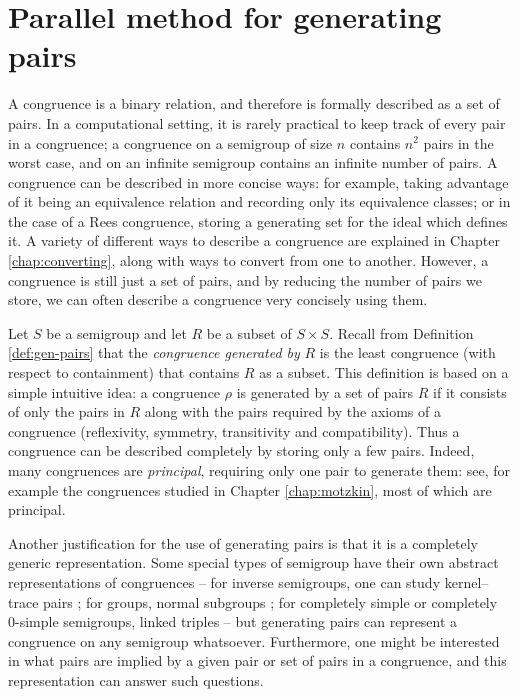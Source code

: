 \chapter{Parallel method for generating pairs}
\label{chap:pairs}

A congruence is a binary relation, and therefore is formally described as a set
of pairs.  In a computational setting, it is rarely practical to keep track of
every pair in a congruence; a congruence on a semigroup of size $n$ contains
$n^2$ pairs in the worst case, and on an infinite semigroup contains an infinite
number of pairs.  A congruence can be described in more concise ways:
for example, taking advantage of it being an equivalence relation
and recording only its equivalence classes; or in the case of a Rees congruence,
storing a generating set for the ideal which defines it.  A variety of different
ways to describe a congruence are explained in Chapter \ref{chap:converting},
along with ways to convert from one to another.  However, a congruence is still just
a set of pairs, and by reducing the number of pairs we store, we can often describe a
congruence very concisely using them.

Let $S$ be a semigroup and let $R$ be a subset of $S \times S$.  Recall from
Definition \ref{def:gen-pairs} that the \textit{congruence generated by} $R$ is
the least congruence (with respect to containment) that contains $R$ as a
subset.
This definition is based on a simple intuitive idea:
a congruence $\rho$ is generated by a set of pairs $R$ if it consists
of only the pairs in $R$ along with the pairs required by the axioms of a
congruence (reflexivity, symmetry, transitivity and compatibility).  Thus a
congruence can be described completely by storing only a few pairs.
Indeed, many congruences are \textit{principal}, requiring only one pair to
generate them: see, for example the congruences studied in Chapter
\ref{chap:motzkin}, most of which are principal.

Another justification for the use of generating pairs is that it is a completely
generic representation.  Some special types of semigroup have their own abstract
representations of congruences -- for inverse semigroups, one can study
kernel--trace pairs \cite[\S 5.3]{howie}; for groups, normal subgroups
\cite[Theorem 11.5]{warner}; for completely simple or completely 0-simple
semigroups, linked triples \cite[\S 3.5]{howie} -- but generating pairs can
represent a congruence on any semigroup whatsoever.  Furthermore, one
might be interested in what pairs are implied by a given pair or set of pairs in
a congruence, and this representation can answer such questions.

